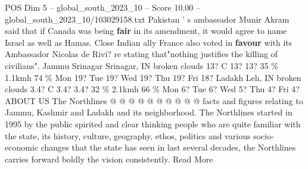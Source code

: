 \begin{textsample}{POS Dim 5 – global\_south\_2023\_10 – Score 10.00 – global\_south\_2023\_10/103029158.txt}
Pakistan ' s ambassador Munir Akram said that if Canada was being \textbf{fair} in its amendment, it would agree to name Israel as well as Hamas.
Close Indian ally France also voted in \textbf{favour} with its Ambassador Nicolas de Rivi? re stating that"nothing justifies the killing of civilians".
Jammu Srinagar Srinagar, IN broken clouds 13?
C 13? 13? 35 \% 1.1kmh 74 \% Mon 19?
Tue 19?
Wed 19?
Thu 19?
Fri 18?
Ladakh Leh, IN broken clouds 3.4?
C 3.4? 3.4? 32 \% 2.1kmh 66 \% Mon 6?
Tue 6?
Wed 5?
Thu 4?
Fri 4?
ABOUT US The Northlines @ @ @ @ @ @ @ @ @ @ facts and figures relating to Jammu, Kashmir and Ladakh and its neighborhood.
The Northlines started in 1995 by the public spirited and clear thinking people who are quite familiar with the state, its history, culture, geography, ethos, politics and various socio-economic changes that the state has seen in last several decades, the Northlines carries forward boldly the vision consistently.
Read More

\end{textsample}
